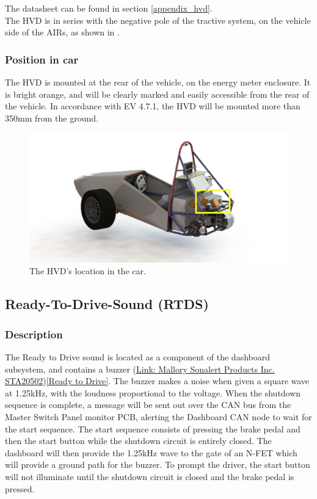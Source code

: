 \documentclass{article}
\begin{document}
The datasheet can be found in section \ref{appendix_hvd}.\\

The HVD is in series with the negative pole of the tractive system, on the vehicle side of the AIRs, as shown in . 

\subsubsection{Position in car}
The HVD is mounted at the rear of the vehicle, on the energy meter enclosure. It is bright orange, and will be clearly marked and easily accessible from the rear of the vehicle. In accordance with EV 4.7.1, the HVD will be mounted more than 350mm from the ground.  

\begin{figure}[H]
\centering
\includegraphics[width=.75\textwidth]{Energy_meter_mounting_full_car.png}
\caption{The HVD's location in the car.}
\label{fig:hvd}
\end{figure}


\subsection{Ready-To-Drive-Sound (RTDS)}\label{ready_to_drive_sound}
\subsubsection{Description}
The Ready to Drive sound is located as a component of the dashboard subsystem, and contains a buzzer (\href{http://www.mallory-sonalert.com/specifications/STA20502.PDF}{Link: Mallory Sonalert Products Inc. STA20502})\ref{Ready to Drive}. The buzzer  makes a noise when given a square wave at 1.25kHz, with the loudness proportional
to the voltage. When the shutdown sequence is complete, a message will be sent out over the CAN bus from the Master Switch Panel monitor PCB, alerting the Dashboard CAN node to wait for the start sequence. The start sequence consists of pressing the brake pedal and then the start button while the shutdown circuit is entirely closed. The dashboard will then provide the 1.25kHz wave to the gate of an N-FET which will provide a ground path for the buzzer. To prompt the driver, the start button will not illuminate until the shutdown circuit is closed and the brake pedal is pressed.
\end{document}
